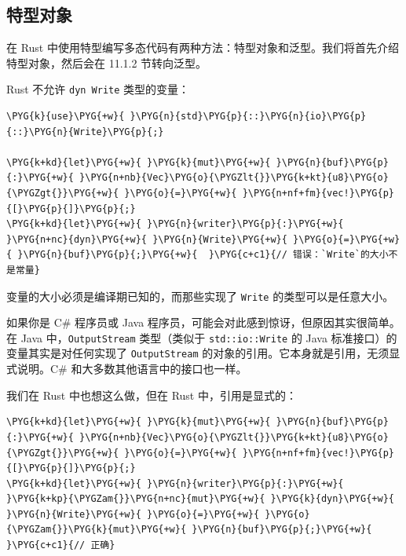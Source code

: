 \subsection{特型对象}

在 Rust 中使用特型编写多态代码有两种方法：特型对象和泛型。我们将首先介绍特型对象，然后会在 11.1.2 节转向泛型。

Rust 不允许 \texttt{dyn Write} 类型的变量：

\begin{Verbatim}[commandchars=\\\{\},breaklines=true,breakanywhere=true,fontsize=\codefont,xleftmargin=17bp]
\PYG{k}{use}\PYG{+w}{ }\PYG{n}{std}\PYG{p}{::}\PYG{n}{io}\PYG{p}{::}\PYG{n}{Write}\PYG{p}{;}

\PYG{k+kd}{let}\PYG{+w}{ }\PYG{k}{mut}\PYG{+w}{ }\PYG{n}{buf}\PYG{p}{:}\PYG{+w}{ }\PYG{n+nb}{Vec}\PYG{o}{\PYGZlt{}}\PYG{k+kt}{u8}\PYG{o}{\PYGZgt{}}\PYG{+w}{ }\PYG{o}{=}\PYG{+w}{ }\PYG{n+nf+fm}{vec!}\PYG{p}{[}\PYG{p}{]}\PYG{p}{;}
\PYG{k+kd}{let}\PYG{+w}{ }\PYG{n}{writer}\PYG{p}{:}\PYG{+w}{ }\PYG{n+nc}{dyn}\PYG{+w}{ }\PYG{n}{Write}\PYG{+w}{ }\PYG{o}{=}\PYG{+w}{ }\PYG{n}{buf}\PYG{p}{;}\PYG{+w}{  }\PYG{c+c1}{// 错误：`Write`的大小不是常量}
\end{Verbatim}

变量的大小必须是编译期已知的，而那些实现了 \texttt{Write} 的类型可以是任意大小。

如果你是 C\# 程序员或 Java 程序员，可能会对此感到惊讶，但原因其实很简单。在 Java 中，\texttt{OutputStream} 类型（类似于 \texttt{std::io::Write} 的 Java 标准接口）的变量其实是对任何实现了 \texttt{OutputStream} 的对象的引用。它本身就是引用，无须显式说明。C\# 和大多数其他语言中的接口也一样。

我们在 Rust 中也想这么做，但在 Rust 中，引用是显式的：

\begin{Verbatim}[commandchars=\\\{\},breaklines=true,breakanywhere=true,fontsize=\codefont,xleftmargin=17bp]
\PYG{k+kd}{let}\PYG{+w}{ }\PYG{k}{mut}\PYG{+w}{ }\PYG{n}{buf}\PYG{p}{:}\PYG{+w}{ }\PYG{n+nb}{Vec}\PYG{o}{\PYGZlt{}}\PYG{k+kt}{u8}\PYG{o}{\PYGZgt{}}\PYG{+w}{ }\PYG{o}{=}\PYG{+w}{ }\PYG{n+nf+fm}{vec!}\PYG{p}{[}\PYG{p}{]}\PYG{p}{;}
\PYG{k+kd}{let}\PYG{+w}{ }\PYG{n}{writer}\PYG{p}{:}\PYG{+w}{ }\PYG{k+kp}{\PYGZam{}}\PYG{n+nc}{mut}\PYG{+w}{ }\PYG{k}{dyn}\PYG{+w}{ }\PYG{n}{Write}\PYG{+w}{ }\PYG{o}{=}\PYG{+w}{ }\PYG{o}{\PYGZam{}}\PYG{k}{mut}\PYG{+w}{ }\PYG{n}{buf}\PYG{p}{;}\PYG{+w}{  }\PYG{c+c1}{// 正确}
\end{Verbatim}

